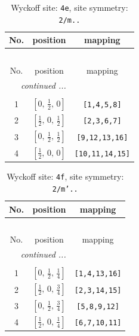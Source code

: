 \documentclass[fleqn,8pt]{jsarticle}
\begin{document}
\begin{longtable}{ccc}
\caption{Wyckoff site: {\tt 4e}, site symmetry: {\tt 2/m..}}
 \\
 \hline \hline
No. & position & mapping \\ \hline \endfirsthead

\multicolumn{2}{l}{\tablename\ \thetable{}} \\
 \hline \hline
No. & position & mapping \\ \hline \endhead

 \hline \hline
\multicolumn{2}{r}{\footnotesize\it continued ...} \\ \endfoot

 \hline \hline
\multicolumn{2}{r}{} \\ \endlastfoot

1 & $\left[ 0,\, \frac{1}{2},\, 0 \right]$ & {\tt [1,4,5,8]} \\ \hline
2 & $\left[ \frac{1}{2},\, 0,\, \frac{1}{2} \right]$ & {\tt [2,3,6,7]} \\ \hline
3 & $\left[ 0,\, \frac{1}{2},\, \frac{1}{2} \right]$ & {\tt [9,12,13,16]} \\ \hline
4 & $\left[ \frac{1}{2},\, 0,\, 0 \right]$ & {\tt [10,11,14,15]} \\
\end{longtable}
\renewcommand{\arraystretch}{1.2}
\begin{longtable}{ccc}
\caption{Wyckoff site: {\tt 4f}, site symmetry: {\tt 2/m'..}}
 \\
 \hline \hline
No. & position & mapping \\ \hline \endfirsthead

\multicolumn{2}{l}{\tablename\ \thetable{}} \\
 \hline \hline
No. & position & mapping \\ \hline \endhead

 \hline \hline
\multicolumn{2}{r}{\footnotesize\it continued ...} \\ \endfoot

 \hline \hline
\multicolumn{2}{r}{} \\ \endlastfoot

1 & $\left[ 0,\, \frac{1}{2},\, \frac{1}{4} \right]$ & {\tt [1,4,13,16]} \\ \hline
2 & $\left[ \frac{1}{2},\, 0,\, \frac{3}{4} \right]$ & {\tt [2,3,14,15]} \\ \hline
3 & $\left[ 0,\, \frac{1}{2},\, \frac{3}{4} \right]$ & {\tt [5,8,9,12]} \\ \hline
4 & $\left[ \frac{1}{2},\, 0,\, \frac{1}{4} \right]$ & {\tt [6,7,10,11]} \\
\end{longtable}
\end{document}
